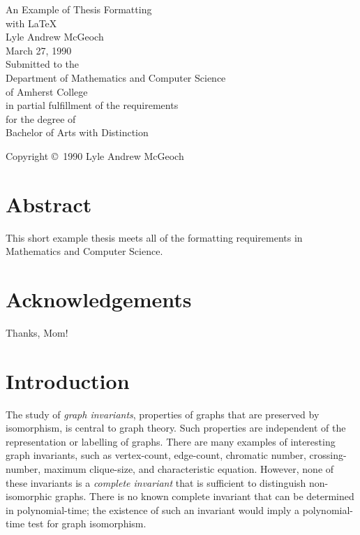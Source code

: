 \documentclass [11pt] {report}
\def\sl{\it}
\begin{document}
\baselineskip 21pt
\evensidemargin 0.25in
\footnotesep 14pt

\begin{titlepage}
\mbox{}
\vspace{1in}
\begin{center}
\LARGE An Example of Thesis Formatting \\
with \LaTeX \\[2in]
\normalsize Lyle Andrew McGeoch \\[\medskipamount]
March 27, 1990 \\[1in]
Submitted to the \\
Department of Mathematics and Computer Science \\
of Amherst College \\
in partial fulfillment of the requirements \\
for the degree of \\
Bachelor of Arts with Distinction
\end{center}
\vfill
\begin{center}
Copyright \copyright\ 1990 Lyle Andrew McGeoch
\end{center}
\end{titlepage}

\evensidemargin 0in

\chapter*{Abstract}
This short example thesis meets all of the formatting requirements in
Mathematics and Computer Science.

\chapter*{Acknowledgements}

\mbox{}\indent Thanks, Mom!

\tableofcontents
\newpage


\chapter{Introduction}

The study of {\sl graph invariants}, properties of graphs that are preserved
by isomorphism, is central to graph theory.  Such properties are independent
of the representation or labelling of graphs.  There are many examples of
interesting graph invariants, such as vertex-count, edge-count, chromatic
number, crossing-number, maximum clique-size, and characteristic equation.
However, none of these invariants is a {\sl complete invariant} that is
sufficient to distinguish non-isomorphic graphs.  There is no known
complete invariant that can be determined in polynomial-time; the existence
of such an invariant would imply a polynomial-time test for graph
isomorphism.
\end{document}

